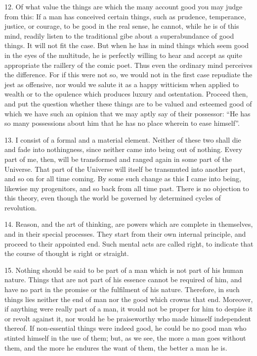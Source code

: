 \documentclass{book}
\begin{document}
12. Of what value the things are which the many account good you may
judge from this: If a man has conceived certain things, such as
prudence, temperance, justice, or courage, to be good in the real
sense, he cannot, while he is of this mind, readily listen to the
traditional gibe about a superabundance of good things. It will not
fit the case. But when he has in mind things which seem good in the
eyes of the multitude, he is perfectly willing to hear and accept as
quite appropriate the raillery of the comic poet. Thus even the
ordinary mind perceives the difference. For if this were not so, we
would not in the first case repudiate the jest as offensive, nor would
we salute it as a happy witticism when applied to wealth or to the
opulence which produces luxury and ostentation. Proceed then, and put
the question whether these things are to be valued and esteemed good
of which we have such an opinion that we may aptly say of their
possessor: ``He has so many possessions about him that he has no place
wherein to ease himself''.

13. I consist of a formal and a material element. Neither of these two
shall die and fade into nothingness, since neither came into being out
of nothing. Every part of me, then, will be transformed and ranged
again in some part of the Universe. That part of the Universe will
itself be transmuted into another part, and so on for all time
coming. By some such change as this I came into being, likewise my
progenitors, and so back from all time past. There is no objection to
this theory, even though the world be governed by determined cycles of
revolution.

14. Reason, and the art of thinking, are powers which are complete in
themselves, and in their special processes. They start from their own
internal principle, and proceed to their appointed end. Such mental
acts are called right, to indicate that the course of thought is right
or straight.

15. Nothing should be said to be part of a man which is not part of
his human nature. Things that are not part of his essence cannot be
required of him, and have no part in the promise or the fulfilment of
his nature. Therefore, in such things lies neither the end of man nor
the good which crowns that end. Moreover, if anything were really part
of a man, it would not be proper for him to despise it or revolt
against it, nor would he be praiseworthy who made himself independent
thereof. If non-essential things were indeed good, he could be no good
man who stinted himself in the use of them; but, as we see, the more a
man goes without them, and the more he endures the want of them, the
better a man he is.
\end{document}
